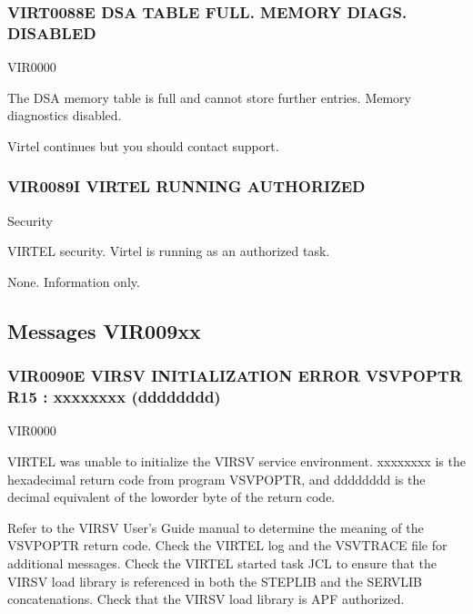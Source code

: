 \documentclass[letterpaper,10pt,english]{sphinxmanual}
\begin{document}
\subsubsection{VIRT0088E DSA TABLE FULL. MEMORY DIAGS. DISABLED}
\label{\detokenize{messages:virt0088e-dsa-table-full-memory-diags-disabled}}\begin{description}
\sphinxAtStartPar
VIR0000

\sphinxAtStartPar
The DSA memory table is full and cannot store further entries. Memory diagnostics disabled.

\sphinxAtStartPar
Virtel continues but you should contact support.

\end{description}


\subsubsection{VIR0089I VIRTEL RUNNING AUTHORIZED}
\label{\detokenize{messages:vir0089i-virtel-running-authorized}}\begin{description}
\sphinxAtStartPar
Security

\sphinxAtStartPar
VIRTEL security. Virtel is running as an authorized task.

\sphinxAtStartPar
None. Information only.

\end{description}


\subsection{Messages VIR009xx}
\label{\detokenize{messages:messages-vir009xx}}

\subsubsection{VIR0090E VIRSV INITIALIZATION ERROR \sphinxhyphen{}VSVPOPTR R15 : xxxxxxxx (dddddddd)}
\label{\detokenize{messages:vir0090e-virsv-initialization-error-vsvpoptr-r15-xxxxxxxx-dddddddd}}\begin{description}
\sphinxAtStartPar
VIR0000

\sphinxAtStartPar
VIRTEL was unable to initialize the VIRSV service environment. xxxxxxxx is the hexadecimal return code from program VSVPOPTR, and dddddddd is the decimal equivalent of the low\sphinxhyphen{}order byte of the return code.

\sphinxAtStartPar
Refer to the VIRSV User’s Guide manual to determine the meaning of the VSVPOPTR return code. Check the VIRTEL log and the VSVTRACE file for additional messages. Check the VIRTEL started task JCL to ensure that the VIRSV load library is referenced in both the STEPLIB and the SERVLIB concatenations. Check that the VIRSV load library is APF\sphinxhyphen{} authorized.

\end{description}
\end{document}
